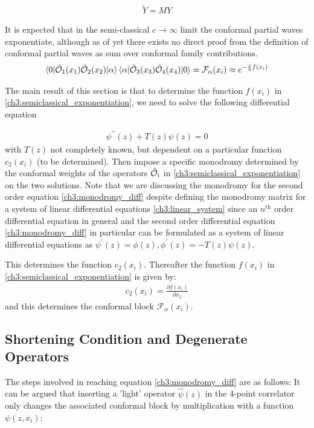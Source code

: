  \begin{align}
  \tilde{Y} = M Y
 \end{align}
 
It is expected that in the semi-classical $c \to \infty$ limit the conformal partial waves exponentiate, although as of yet there exists no direct proof from the definition of conformal partial waves as sum over conformal family contributions. 
\begin{align} \label{ch3:semiclassical_exponentiation}
 \braket{0|\hat{\mathcal{{O}}}_1(x_1)\hat{\mathcal{{O}}}_2(x_2)|\alpha}\braket{\alpha|\hat{\mathcal{{O}}}_3(x_3)\hat{\mathcal{{O}}}_4(x_4)|0} = \mathcal{F}_{\alpha}(x_i) \approx e^{-\frac{c}{6}f(x_i)}
\end{align}

The main result of this section is that to determine the function $f(x_i)$ in \ref{ch3:semiclassical_exponentiation}, we need to solve the following differential equation

\begin{align} \label{ch3:monodromy_diff}
 \psi^{\prime\prime}(z)+T(z)\psi(z)=0
\end{align}
with $T(z)$ not completely known, but dependent on a particular function $c_2(x_i)$ (to be determined). Then impose a specific monodromy determined by the conformal weights of the operators $\hat{\mathcal{{O}}}_i$ in \ref{ch3:semiclassical_exponentiation} on the two solutions. Note that we are discussing the monodromy for the second order equation \ref{ch3:monodromy_diff} despite defining the monodromy matrix for a system of linear differential equations \ref{ch3:linear_system} since an $n^\text{th}$ order differential equation in general and the second order differential equation \ref{ch3:monodromy_diff} in particular can be formulated as a system of linear differential equations as $\psi^\prime(z)=\phi(z), \phi^\prime(z)=-T(z)\psi(z)$.

This determines the function $c_2(x_i)$. Thereafter the function $f(x_i)$ in \ref{ch3:semiclassical_exponentiation} is given by:
\begin{align}
 c_2(x_i)=\frac{\partial f(x_i)}{\partial x_2}
\end{align}
and this determines the conformal block $\mathcal{F}_{\alpha}(x_i)$. 


\subsection{Shortening Condition and Degenerate Operators}

The steps involved in reaching equation \ref{ch3:monodromy_diff} are as follows: It can be argued \cite{Fitzpatrick:2015zha} that inserting a 'light' operator $\hat{\psi}(z)$ in the 4-point correlator only changes the associated conformal block by multiplication with a function $\psi(z,x_i)$:

